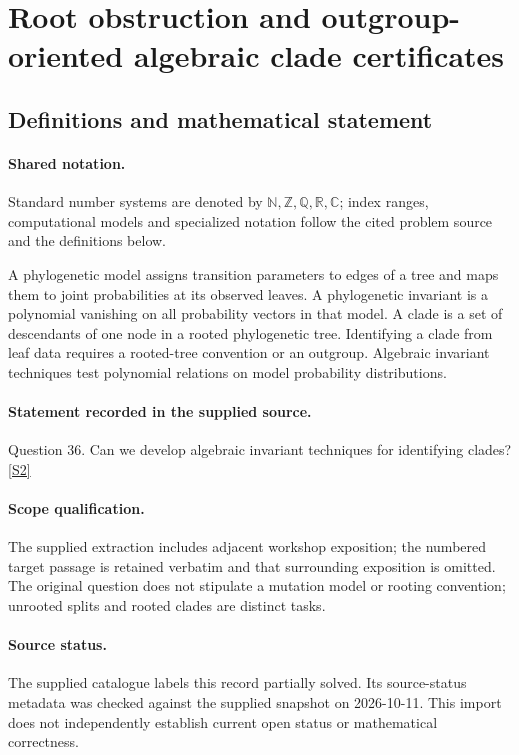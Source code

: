 \documentclass[11pt]{article}
\newcommand{\sref}[2]{\hyperlink{source:#1:#2}{[S#2]}}
\begin{document}
\section{Root obstruction and outgroup-oriented algebraic clade certificates}\label{statement}

\subsection{Definitions and mathematical statement}

\paragraph{Shared notation.}Standard number systems are denoted by $\mathbb N,\mathbb Z,\mathbb Q,\mathbb R,\mathbb C$; index ranges, computational models and specialized notation follow the cited problem source and the definitions below.


A phylogenetic model assigns transition parameters to edges of a tree and maps them to joint probabilities at its observed leaves. A phylogenetic invariant is a polynomial vanishing on all probability vectors in that model. A clade is a set of descendants of one node in a rooted phylogenetic tree. Identifying a clade from leaf data requires a rooted-tree convention or an outgroup. Algebraic invariant techniques test polynomial relations on model probability distributions.
\paragraph{Statement recorded in the supplied source.}
Question 36. Can we develop algebraic invariant techniques for identifying clades? \sref{statement}{2}
\paragraph{Scope qualification.}
The supplied extraction includes adjacent workshop exposition; the numbered target passage is retained verbatim and that surrounding exposition is omitted. The original question does not stipulate a mutation model or rooting convention; unrooted splits and rooted clades are distinct tasks.
\paragraph{Source status.}
The supplied catalogue labels this record partially solved. Its source-status metadata was checked against the supplied snapshot on 2026-10-11. This import does not independently establish current open status or mathematical correctness.
\end{document}
